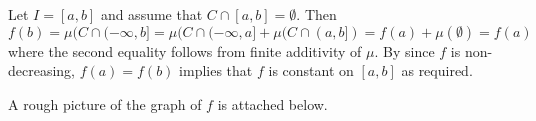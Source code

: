\documentclass[12pt]{amsart} %
\begin{document}
Let $I = [a,b]$ and assume that $C \cap [a,b] = \emptyset$. Then $$f(b) = \mu(C \cap (-\infty, b] = \mu(C \cap (-\infty, a] + \mu(C \cap (a,b]) = f(a) + \mu(\emptyset) = f(a)$$ where the second equality follows from finite additivity of $\mu$. By since $f$ is non-decreasing,  $f(a) = f(b)$ implies that  $f$ is constant on  $[a,b]$ as required.

A rough picture of the graph of $f$ is attached below.   

 
 


 

 











  




















\vfill 
 
\end{document}
